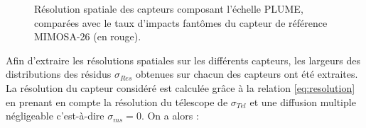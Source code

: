    \medskip
   
  
  \begin{figure}[htb!]
     \begin{center}
     \end{center}
     \caption{R\'esolution spatiale des capteurs composant l'\'echelle PLUME, compar\'ees avec le taux d'impacts fant\^omes du capteur de r\'ef\'erence MIMOSA-26 (en rouge).}
     \label{fig:resol_PLUME}
   \end{figure} 

   
   Afin d'extraire les r\'esolutions spatiales sur les diff\'erents capteurs, les largeurs des distributions des r\'esidus $\sigma_{Res}$ obtenues sur chacun des capteurs ont \'et\'e extraites. La r\'esolution du capteur consid\'er\'e est calcul\'ee grâce \`a la relation \ref{eq:resolution} en prenant en compte la r\'esolution du t\'elescope de $\sigma_{Tel}$ et une diffusion multiple n\'egligeable c'est-à-dire $\sigma_{ms} = 0$. On a alors :
   
